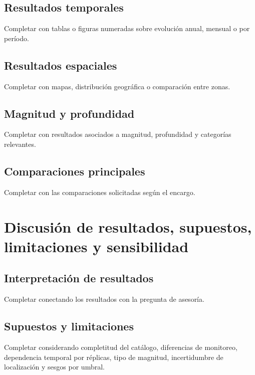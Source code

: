 \documentclass[
  spanish,
  letterpaper,
  DIV=11,
  numbers=noendperiod]{scrartcl}
\begin{document}
\subsection{Resultados temporales}\label{resultados-temporales}

Completar con tablas o figuras numeradas sobre evolución anual, mensual
o por período.

\subsection{Resultados espaciales}\label{resultados-espaciales}

Completar con mapas, distribución geográfica o comparación entre zonas.

\subsection{Magnitud y profundidad}\label{magnitud-y-profundidad}

Completar con resultados asociados a magnitud, profundidad y categorías
relevantes.

\subsection{Comparaciones principales}\label{comparaciones-principales}

Completar con las comparaciones solicitadas según el encargo.

\section{Discusión de resultados, supuestos, limitaciones y
sensibilidad}\label{discusiuxf3n-de-resultados-supuestos-limitaciones-y-sensibilidad}

\subsection{Interpretación de
resultados}\label{interpretaciuxf3n-de-resultados}

Completar conectando los resultados con la pregunta de asesoría.

\subsection{Supuestos y limitaciones}\label{supuestos-y-limitaciones}

Completar considerando completitud del catálogo, diferencias de
monitoreo, dependencia temporal por réplicas, tipo de magnitud,
incertidumbre de localización y sesgos por umbral.
\end{document}
